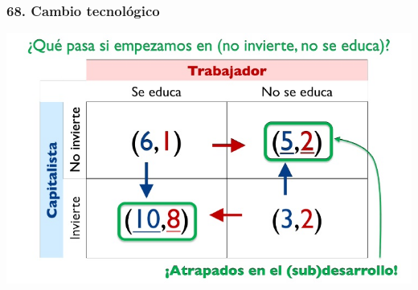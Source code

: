 \documentclass[14pt]{beamer}
\begin{document}
\begin{frame}
\frametitle{68. Cambio tecnológico}
\centering
\includegraphics[scale=0.6]{Figures/Tema_03_34_catecno.jpg}
\end{frame}
\end{document}
